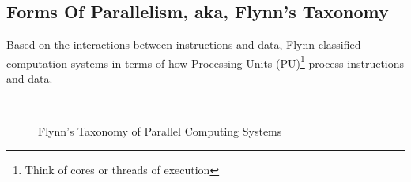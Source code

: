 \subsection{Forms Of Parallelism, aka, Flynn's Taxonomy}
Based on the interactions between instructions and data, Flynn \cite{Fly72} classified computation systems in terms of how Processing Units (PU)\footnote{Think of cores or threads of execution} process instructions and data.

\begin{figure}[H]
  \centering
  \\
  \caption{Flynn's Taxonomy of Parallel Computing Systems}
  \label{fig:FlynnsTaxonomy}
\end{figure}


